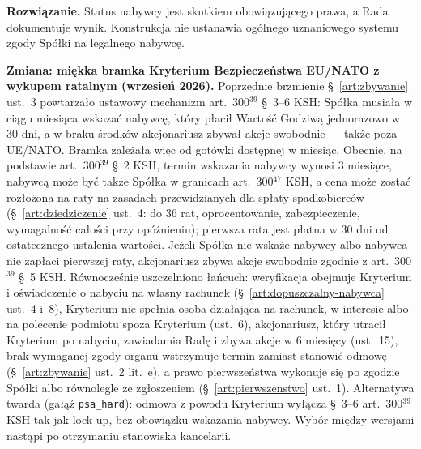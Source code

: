 \documentclass[12pt,a4paper]{report}
\begin{document}
\textbf{Rozwiązanie.} Status nabywcy jest skutkiem obowiązującego prawa, a Rada dokumentuje wynik. Konstrukcja nie ustanawia ogólnego uznaniowego systemu zgody Spółki na legalnego nabywcę.

\textbf{Zmiana: miękka bramka Kryterium Bezpieczeństwa EU/NATO z wykupem ratalnym (wrzesień 2026).} Poprzednie brzmienie §~\ref{art:zbywanie} ust.~3 powtarzało ustawowy mechanizm art.~300$^{39}$ §~3--6 KSH: Spółka musiała w ciągu miesiąca wskazać nabywcę, który płacił Wartość Godziwą jednorazowo w 30 dni, a w braku środków akcjonariusz zbywał akcje swobodnie --- także poza UE/NATO. Bramka zależała więc od gotówki dostępnej w miesiąc. Obecnie, na podstawie art.~300$^{39}$ §~2 KSH, termin wskazania nabywcy wynosi 3 miesiące, nabywcą może być także Spółka w granicach art.~300$^{47}$ KSH, a cena może zostać rozłożona na raty na zasadach przewidzianych dla spłaty spadkobierców (§~\ref{art:dziedziczenie} ust.~4: do 36 rat, oprocentowanie, zabezpieczenie, wymagalność całości przy opóźnieniu); pierwsza rata jest płatna w 30 dni od ostatecznego ustalenia wartości. Jeżeli Spółka nie wskaże nabywcy albo nabywca nie zapłaci pierwszej raty, akcjonariusz zbywa akcje swobodnie zgodnie z art.~300$^{39}$ §~5 KSH. Równocześnie uszczelniono łańcuch: weryfikacja obejmuje Kryterium i oświadczenie o nabyciu na własny rachunek (§~\ref{art:dopuszczalny-nabywca} ust.~4 i~8), Kryterium nie spełnia osoba działająca na rachunek, w interesie albo na polecenie podmiotu spoza Kryterium (ust.~6), akcjonariusz, który utracił Kryterium po nabyciu, zawiadamia Radę i zbywa akcje w 6 miesięcy (ust.~15), brak wymaganej zgody organu wstrzymuje termin zamiast stanowić odmowę (§~\ref{art:zbywanie} ust.~2 lit.~e), a prawo pierwszeństwa wykonuje się po zgodzie Spółki albo równolegle ze zgłoszeniem (§~\ref{art:pierwszenstwo} ust.~1). Alternatywa twarda (gałąź \texttt{psa\_hard}): odmowa z powodu Kryterium wyłącza §~3--6 art.~300$^{39}$ KSH tak jak lock-up, bez obowiązku wskazania nabywcy. Wybór między wersjami nastąpi po otrzymaniu stanowiska kancelarii.
\end{document}
